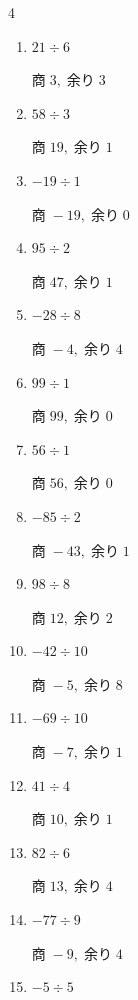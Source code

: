 \begin{multicols}{4}
\begin{enumerate}
        $商\; -8,\; 余り\; 2$

  \item $21 \div 6$

        $商\; 3,\; 余り\; 3$

  \item $58 \div 3$

        $商\; 19,\; 余り\; 1$

  \item $-19 \div 1$

        $商\; -19,\; 余り\; 0$

  \item $95 \div 2$

        $商\; 47,\; 余り\; 1$

  \item $-28 \div 8$

        $商\; -4,\; 余り\; 4$

  \item $99 \div 1$

        $商\; 99,\; 余り\; 0$

  \item $56 \div 1$

        $商\; 56,\; 余り\; 0$

  \item $-85 \div 2$

        $商\; -43,\; 余り\; 1$

  \item $98 \div 8$

        $商\; 12,\; 余り\; 2$

  \item $-42 \div 10$

        $商\; -5,\; 余り\; 8$

  \item $-69 \div 10$

        $商\; -7,\; 余り\; 1$

  \item $41 \div 4$

        $商\; 10,\; 余り\; 1$

  \item $82 \div 6$

        $商\; 13,\; 余り\; 4$

\columnbreak %

  \item $-77 \div 9$

        $商\; -9,\; 余り\; 4$

  \item $-5 \div 5$


\end{enumerate}
\end{multicols}
